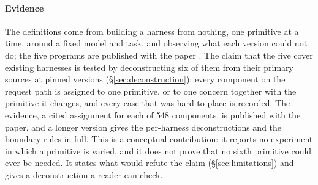 \paragraph{Evidence} The definitions come from building a harness from nothing, one primitive at a time, around a fixed model and task, and observing what each version could not do; the five programs are published with the paper \cite{course}. The claim that the five cover existing harnesses is tested by deconstructing six of them from their primary sources at pinned versions (\S\ref{sec:deconstruction}): every component on the request path is assigned to one primitive, or to one concern together with the primitive it changes, and every case that was hard to place is recorded. The evidence, a cited assignment for each of 548 components, is published with the paper, and a longer version gives the per-harness deconstructions and the boundary rules in full. This is a conceptual contribution: it reports no experiment in which a primitive is varied, and it does not prove that no sixth primitive could ever be needed. It states what would refute the claim (\S\ref{sec:limitations}) and gives a deconstruction a reader can check.
